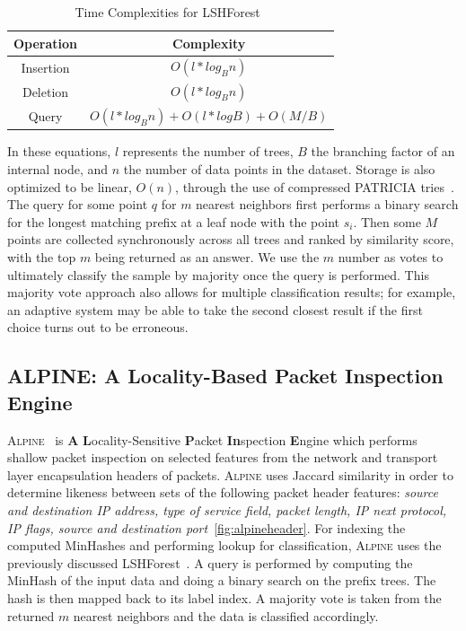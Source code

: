 \begin{table} [ht!]
\caption{Time Complexities for LSHForest~\cite{lshforest}}
\centering
\begin{tabular}{|c | c |}
\hline
\textbf{Operation} & \textbf{Complexity} \\
\hline
Insertion & $O(l * log_B n)$ \\
\hline
Deletion & $O(l * log_B n)$ \\
\hline
Query &  $O(l * log_B n) + O(l * log B) + O(M/B)$\\
\hline
\end{tabular}
\label{table:forestcomplex}
\end{table}

In these equations, $l$ represents the number of trees, $B$ the branching factor of an internal node, and $n$ the number of data points in the dataset. Storage is also optimized to be linear, $O(n)$, through the use of compressed PATRICIA tries~\cite{lshforest}. The query for some point $q$ for $m$ nearest neighbors first performs a binary search for the longest matching prefix at a leaf node with the point $s_i$. Then some $M$ points are collected synchronously across all trees and ranked by similarity score, with the top $m$ being returned as an answer. We use the $m$ number as votes to ultimately classify the sample by majority once the query is performed. This majority vote approach also allows for multiple classification results; for example, an adaptive system may be able to take the second closest result if the first choice turns out to be erroneous.

\subsection{ALPINE: A Locality-Based Packet Inspection Engine}
\textsc{Alpine}~\cite{alpinepalm} is \textbf{A} \textbf{L}ocality-Sensitive \textbf{P}acket \textbf{In}spection \textbf{E}ngine which performs shallow packet inspection on selected features from the network and transport layer encapsulation headers of packets. \textsc{Alpine} uses Jaccard similarity in order to determine likeness between sets of the following packet header features: \textit{source and destination IP address, type of service field, packet length, IP next protocol, IP flags, source and destination port}~\ref{fig:alpineheader}. For indexing the computed MinHashes and performing lookup for classification, \textsc{Alpine} uses the previously discussed LSHForest~\cite{lshforest}. A query is performed by computing the MinHash of the input data and doing a binary search on the prefix trees. The hash is then mapped back to its label index. A majority vote is taken from the returned $m$ nearest neighbors and the data is classified accordingly.

